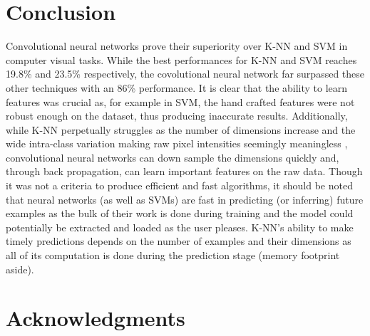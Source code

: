 \documentclass{article} %
\begin{document}
\section{Conclusion}
Convolutional neural networks prove their superiority over K-NN and SVM in computer visual tasks. While the best performances for K-NN and SVM reaches 19.8\% and 23.5\% respectively, the covolutional neural network far surpassed these other techniques with an 86\% performance. It is clear that the ability to learn features was crucial as, for example in SVM, the hand crafted features were not robust enough on the dataset, thus producing inaccurate results. Additionally, while K-NN perpetually struggles as the number of dimensions increase and the wide intra-class variation making raw pixel intensities seemingly meaningless , convolutional neural networks can down sample the dimensions quickly and, through back propagation, can learn important features on the raw data. Though it was not a criteria to produce efficient and fast algorithms, it should be noted that neural networks (as well as SVMs) are fast in predicting (or inferring) future examples as the bulk of their work is done during training and the model could potentially be extracted and loaded as the user pleases. K-NN's ability to make timely predictions depends on the number of examples and their dimensions as all of its computation is done during the prediction stage (memory footprint aside).



\section*{Acknowledgments}

\small{
\nocite{*}


}
\end{document}
